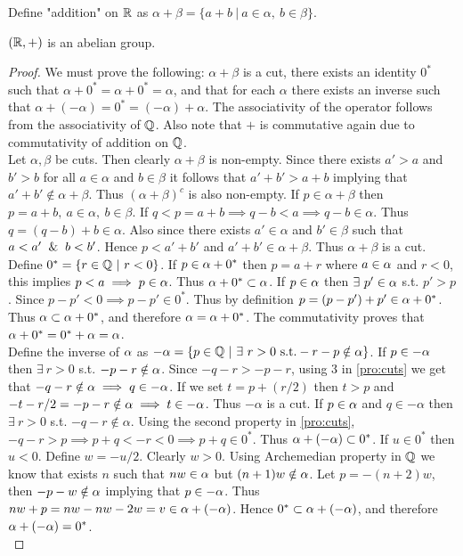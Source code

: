 \begin{definition}
  Define "addition" on $\mathbb{R}$ as $\alpha + \beta = \{a+b\ |\ a\in \alpha,\ b\in\beta\}$.
\end{definition}
\begin{proposition}
  $(\mathbb{R},+)$ is an abelian group. 
\end{proposition}
\begin{proof}
  We must prove the following: $\alpha+\beta$ is a cut, there exists an identity $0^*$ such that $\alpha + 0^* = \alpha + 0^* = \alpha$, and that for each $\alpha$ there exists an inverse such that $\alpha + (-\alpha) = 0^* = (-\alpha) + \alpha$. The associativity of the operator follows from the associativity of $\mathbb{Q}$. Also note that $+$ is commutative again due to commutativity of addition on $\mathbb{Q}$.\\

  Let $\alpha,\beta$ be cuts. Then clearly $\alpha+\beta$ is non-empty. Since there exists $a'>a$ and $b'>b$ for all $a\in \alpha$ and $b\in\beta$ it follows that $a'+b'>a+b$ implying that $a'+b' \notin \alpha+\beta$. Thus $(\alpha+\beta)^c$ is also non-empty. If $p \in \alpha+\beta$ then $p = a+b,\ a\in \alpha,\ b\in \beta$. If $q<p= a+b \implies q-b < a \implies q-b\in \alpha$. Thus $q = (q-b)+b \in \alpha$. Also since there exists $a'\in \alpha$ and $b'\in \beta$ such that $a<a'\And b<b'$. Hence $p<a'+b'$ and $a'+b'\in \alpha+\beta$. Thus $\alpha+\beta$ is a cut.\\

  Define $0^* = \{r\in \mathbb{Q}\ |\ r<0\}$. If $p\in \alpha + 0^*$ then $p = a+r$ where $a\in\alpha$ and $r<0$, this implies $p<a \implies p\in \alpha$. Thus $\alpha+0^* \subset \alpha$. If $p\in \alpha$ then $\exists\ p' \in \alpha$ s.t. $p'>p$. Since $p-p'<0 \implies p-p'\in 0^*$. Thus by definition $p = (p-p')+p'\in \alpha + 0^*$. Thus $\alpha \subset \alpha + 0^*$, and therefore $\alpha = \alpha + 0^*$. The commutativity proves that $\alpha + 0^* = 0^* + \alpha = \alpha$.\\

  Define the inverse of $\alpha$ as $-\alpha = \{p\in \mathbb{Q}\ |\ \exists\ r>0\ \text{s.t.} -r-p\notin \alpha\}$. If $p\in-\alpha$ then $\exists\ r>0$ s.t. $-p-r \notin \alpha$. Since $-q-r>-p-r$, using 3 in \cref{pro:cuts} we get that $-q-r\notin \alpha\implies q\in -\alpha$. If we set $t = p + (r/2)$ then $t>p$ and $-t-r/2 = -p -r \notin \alpha \implies t\in -\alpha$. Thus $-\alpha$ is a cut. If $p\in \alpha$ and $q\in -\alpha$ then $\exists\ r>0$ s.t. $-q-r\notin \alpha$. Using the second property in \cref{pro:cuts}, $-q-r>p \implies p+q < -r < 0 \implies p+q \in 0^*$. Thus $\alpha + (-\alpha) \subset 0^*$. If $u\in 0^*$ then $u<0$. Define $w = -u/2$. Clearly $w>0$. Using Archemedian property in $\mathbb{Q}$ we know that exists $n$ such that $nw\in \alpha$ but $(n+1)w \notin \alpha$. Let $p = -(n+2)w$, then $-p-w\notin \alpha$ implying that $p\in -\alpha$. Thus $nw + p = nw - nw - 2w = v \in \alpha + (-\alpha)$. Hence $0^* \subset \alpha + (-\alpha)$, and therefore $\alpha + (-\alpha) = 0^*$.\\
\end{proof}
